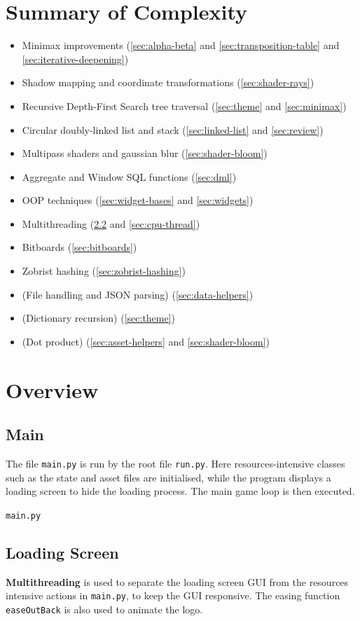 \documentclass[../main/main.tex]{subfiles}
\begin{document}
\section{Summary of Complexity}
\begin{itemize}
\item Minimax improvements (\ref{sec:alpha-beta} and \ref{sec:transposition-table} and \ref{sec:iterative-deepening})
\item Shadow mapping and coordinate transformations (\ref{sec:shader-rays})
\item Recursive Depth-First Search tree traversal (\ref{sec:theme} and \ref{sec:minimax})
\item Circular doubly-linked list and stack (\ref{sec:linked-list} and \ref{sec:review})
\item Multipass shaders and gaussian blur (\ref{sec:shader-bloom})
\item Aggregate and Window SQL functions (\ref{sec:dml})
\item OOP techniques (\ref{sec:widget-bases} and \ref{sec:widgets})
\item Multithreading (\ref{sec:loading-screen} and \ref{sec:cpu-thread})
\item Bitboards (\ref{sec:bitboards})
\item Zobrist hashing (\ref{sec:zobrist-hashing})
\item (File handling and JSON parsing) (\ref{sec:data-helpers})
\item (Dictionary recursion) (\ref{sec:theme})
\item (Dot product) (\ref{sec:asset-helpers} and \ref{sec:shader-bloom})
\end{itemize}

\section{Overview}
\subsection{Main}
The file \lstinline{main.py} is run by the root file \lstinline{run.py}. Here resources-intensive classes such as the state and asset files are initialised, while the program displays a loading screen to hide the loading process. The main game loop is then executed.

\noindent\verb|main.py|


\subsection{Loading Screen}
\label{sec:loading-screen}
\textbf{Multithreading} is used to separate the loading screen GUI from the resources intensive actions in \lstinline{main.py}, to keep the GUI responsive. The easing function \lstinline{easeOutBack} is also used to animate the logo.
\end{document}
